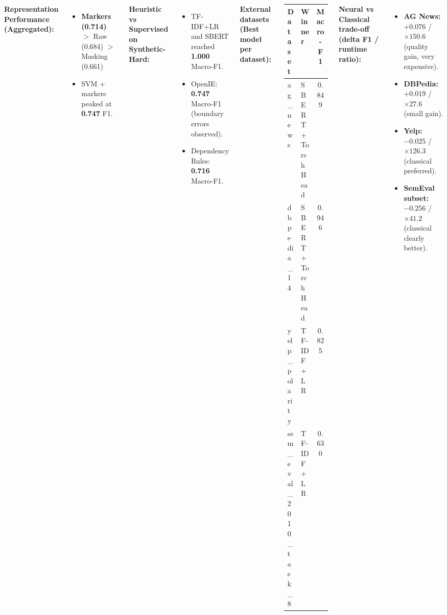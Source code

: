 \documentclass[20pt, a0paper, portrait]{tikzposter} %
\begin{document}
\begin{columns}
{    \vspace{0.3cm}
    \textbf{Representation Performance (Aggregated):}
    \begin{itemize}[leftmargin=*]
        \item \textbf{Markers (0.714)} $>$ Raw (0.684) $>$ Masking (0.661)
        \item SVM + markers peaked at \textbf{0.747} F1.
    \end{itemize}

    \vspace{0.2cm}
    \textbf{Heuristic vs Supervised on Synthetic-Hard:}
    \begin{itemize}[leftmargin=*, noitemsep]
        \item TF-IDF+LR and SBERT reached \textbf{1.000} Macro-F1.
        \item OpenIE: \textbf{0.747} Macro-F1 (boundary errors observed).
        \item Dependency Rules: \textbf{0.716} Macro-F1.
    \end{itemize} 

    \vspace{0.25cm}
    \textbf{External datasets (Best model per dataset):}\\[-0.1cm]
    \begin{center}
    \begin{tabular}{l l c}
        \toprule
        \textbf{Dataset} & \textbf{Winner} & \textbf{Macro-F1} \\
        \midrule
        ag\_news & SBERT + TorchHead & 0.849 \\
        dbpedia\_14 & SBERT + TorchHead & 0.946 \\
        yelp\_polarity & TF-IDF + LR & 0.825 \\
        sem\_eval\_2010\_task\_8 & TF-IDF + LR & 0.630 \\
        \bottomrule
    \end{tabular}
    \end{center}

    \vspace{0.2cm}
    \textbf{Neural vs Classical trade-off (delta F1 / runtime ratio):}
    \begin{itemize}[leftmargin=*, noitemsep] 
        \item \textbf{AG News:} $+0.076$ / $\times 150.6$ (quality gain, very expensive).
        \item \textbf{DBPedia:} $+0.019$ / $\times 27.6$ (small gain).
        \item \textbf{Yelp:} $-0.025$ / $\times 126.3$ (classical preferred).
        \item \textbf{SemEval subset:} $-0.256$ / $\times 41.2$ (classical clearly better).
    \end{itemize}

}
\end{columns}
\end{document}
